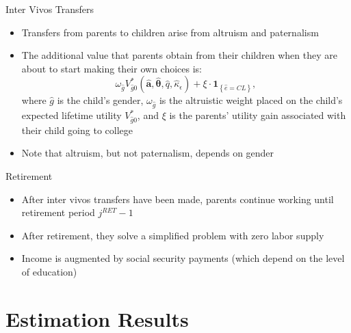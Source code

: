 \documentclass{beamer}
\begin{document}
\begin{frame}{Inter Vivos Transfers}
\begin{itemize}
  \item Transfers from parents to children arise from altruism and paternalism
  \item The additional value that parents obtain from their children when they are about to 					start making their own choices is: 
  		$$\omega_{\hat{g}}V^{*}_{\hat{g}0}(\hat{\textbf{a}},\hat{\boldsymbol{\theta}},\hat{q},					\hat{\kappa}_{\epsilon})+\xi\cdot\textbf{1}_{\left\{\hat{e}=CL\right\}},$$
        where $\hat{g}$ is the child's gender, $\omega_{\hat{g}}$ is the altruistic weight placed on the 		 child's expected lifetime utility $V^{*}_{\hat{g}0}$, and $\xi$ is the parents' utility gain 			associated with their child going to college
  \item Note that altruism, but not paternalism, depends on gender
\end{itemize}      
\hyperlink{Altruism}{}
\end{frame} 

\begin{frame}{Retirement}
\begin{itemize}
  \item After inter vivos transfers have been made, parents continue working until retirement period 			$j^{RET}-1$
  \item After retirement, they solve a simplified problem with zero labor supply
  \item Income is augmented by social security payments (which depend on the level of education)
\end{itemize}      
\end{frame} 



\section{Estimation Results}
\end{document}
